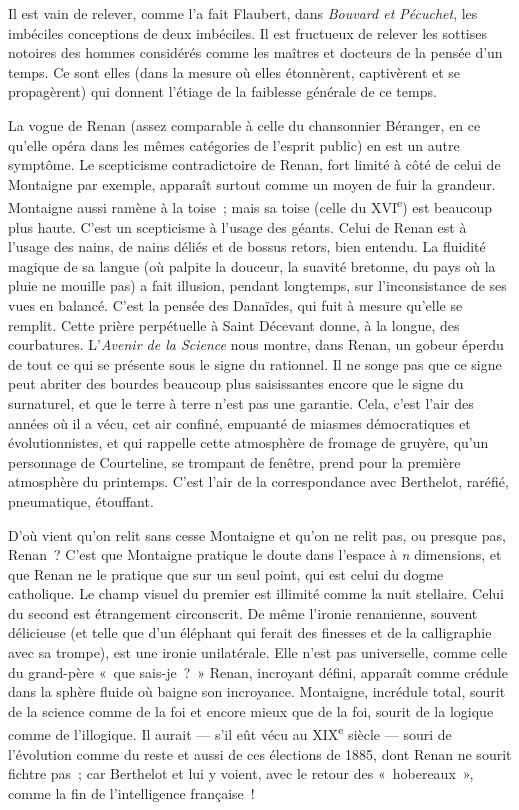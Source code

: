 \documentclass[french,twoside]{book} %
\begin{document}
Il est vain de relever, comme l’a fait Flaubert, dans {\itshape Bouvard et Pécuchet}, les imbéciles conceptions de deux imbéciles. Il est fructueux de relever les sottises notoires des hommes considérés comme les maîtres et docteurs de la pensée d’un temps. Ce sont elles (dans la mesure où elles étonnèrent, captivèrent et se propagèrent) qui donnent l’étiage de la faiblesse générale de ce temps.\par
La vogue de Renan (assez comparable à celle du chansonnier Béranger, en ce qu’elle opéra dans les mêmes catégories de l’esprit public) en est un autre symptôme. Le scepticisme contradictoire de Renan, fort limité à côté de celui de Montaigne par exemple, apparaît surtout comme un moyen de fuir la grandeur. Montaigne aussi ramène à la toise ; mais sa toise (celle du XVI\textsuperscript{e}) est beaucoup plus haute. C’est un scepticisme à l’usage des géants. Celui de Renan est à l’usage des nains, de nains déliés et de bossus retors, bien entendu. La fluidité magique de sa langue (où palpite la douceur, la suavité bretonne, du pays où la pluie ne mouille pas) a fait illusion, pendant longtemps, sur l’inconsistance de ses vues en balancé. C’est la pensée des Danaïdes, qui fuit à mesure qu’elle se remplit. Cette prière perpétuelle à Saint Décevant donne, à la longue, des courbatures. L’{\itshape Avenir de la Science} nous montre, dans Renan, un gobeur éperdu de tout ce qui se présente sous le signe du rationnel. Il ne songe pas que ce signe peut abriter des bourdes beaucoup plus saisissantes encore que le signe du surnaturel, et que le terre à terre n’est pas une garantie. Cela, c’est l’air des années où il a vécu, cet air confiné, empuanté de miasmes démocratiques et évolutionnistes, et qui rappelle cette atmosphère de fromage de gruyère, qu’un personnage de Courteline, se trompant de fenêtre, prend pour la première atmosphère du printemps. C’est l’air de la correspondance avec Berthelot, raréfié, pneumatique, étouffant.\par
D’où vient qu’on relit sans cesse Montaigne et qu’on ne relit pas, ou presque pas, Renan ? C’est que Montaigne pratique le doute dans l’espace à {\itshape n} dimensions, et que Renan ne le pratique que sur un seul point, qui est celui du dogme catholique. Le champ visuel du premier est illimité comme la nuit stellaire. Celui du second est étrangement circonscrit. De même l’ironie renanienne, souvent délicieuse (et telle que d’un éléphant qui ferait des finesses et de la calligraphie avec sa trompe), est une ironie unilatérale. Elle n’est pas universelle, comme celle du grand-père « que sais-je ? » Renan, incroyant défini, apparaît comme crédule dans la sphère fluide où baigne son incroyance. Montaigne, incrédule total, sourit de la science comme de la foi et encore mieux que de la foi, sourit de la logique comme de l’illogique. Il aurait — s’il eût vécu au XIX\textsuperscript{e} siècle — souri de l’évolution comme du reste et aussi de ces élections de 1885, dont Renan ne sourit fichtre pas ; car Berthelot et lui y voient, avec le retour des « hobereaux », comme la fin de l’intelligence française !\par
\end{document}
